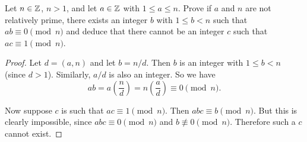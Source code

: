    Let   $n\in\mathbb{Z}$,   $n>1$,   and   let   $a\in\mathbb{Z}$   with
$1\leq a\leq n$. Prove if $a$  and $n$ are not relatively prime, there
exists an integer  $b$ with $1\leq b<n$  such that $ab\equiv0\pmod{n}$
and  deduce   that  there   cannot  be  an   integer  $c$   such  that
$ac\equiv1\pmod{n}$.
\begin{proof}
  Let $d = (a, n)$ and let $b = n/d$. Then $b$ is an integer with
  $1\leq b<n$ (since $d > 1$). Similarly, $a/d$ is also an integer. So
  we have
  \begin{equation*}
    ab = a\left(\frac{n}{d}\right) = n\left(\frac{a}{d}\right) \equiv0\pmod{n}.
  \end{equation*}

  Now suppose $c$ is such that $ac\equiv1\pmod{n}$. Then
  $abc\equiv b\pmod{n}$. But this is clearly impossible, since
  $abc\equiv0\pmod{n}$ and $b\not\equiv0\pmod{n}$. Therefore such a
  $c$ cannot exist.
\end{proof}
